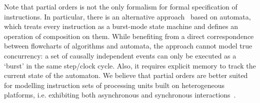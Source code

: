 Note that partial orders is not the only formalism for formal specification
of instructions. In particular, there is an alternative approach~\cite{1994_baranov_book}
based on automata, which treats every instruction as a burst-mode
state machine and defines an operation of composition on them. While
benefiting from a direct correspondence between flowcharts of algorithms
and automata, the approach cannot model true concurrency: a set of
causally independent events can only be executed as a `burst' in
the same step/clock cycle. Also, it requires explicit memory to track
the current state of the automaton. We believe that partial orders
are better suited for modelling instruction sets of processing units
built on heterogeneous platforms, i.e. exhibiting both asynchronous
and synchronous interactions~\cite{2011_mokhov_tr}.

